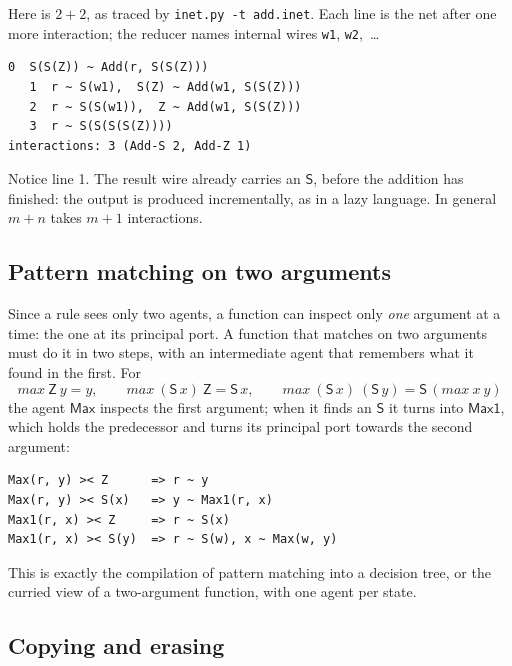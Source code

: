\documentclass[11pt,a4paper]{article}
\newcommand{\ag}[1]{\mathsf{#1}}
\newcommand{\Z}{\ag{Z}}
\newcommand{\Sa}{\ag{S}}
\theoremstyle{definition}
\theoremstyle{plain}
\begin{document}
Here is $2+2$, as traced by \texttt{inet.py -t add.inet}. Each line is the
net after one more interaction; the reducer names internal wires
\texttt{w1}, \texttt{w2},~\dots
\begin{lstlisting}[style=trace]
   0  S(S(Z)) ~ Add(r, S(S(Z)))
   1  r ~ S(w1),  S(Z) ~ Add(w1, S(S(Z)))
   2  r ~ S(S(w1)),  Z ~ Add(w1, S(S(Z)))
   3  r ~ S(S(S(S(Z))))
interactions: 3 (Add-S 2, Add-Z 1)
\end{lstlisting}
Notice line 1. The result wire already carries an $\Sa$, before the addition
has finished: the output is produced incrementally, as in a lazy language.
In general $m+n$ takes $m+1$ interactions.

\subsection{Pattern matching on two arguments}

Since a rule sees only two agents, a function can inspect only \emph{one}
argument at a time: the one at its principal port. A function that matches on
two arguments must do it in two steps, with an intermediate agent that
remembers what it found in the first. For
\[
  \mathit{max}\ \Z\ y = y, \qquad
  \mathit{max}\ (\Sa\,x)\ \Z = \Sa\,x, \qquad
  \mathit{max}\ (\Sa\,x)\ (\Sa\,y) = \Sa\,(\mathit{max}\ x\ y)
\]
the agent $\ag{Max}$ inspects the first argument; when it finds an $\Sa$ it
turns into $\ag{Max1}$, which holds the predecessor and turns its principal
port towards the second argument:
\begin{lstlisting}
Max(r, y) >< Z      => r ~ y
Max(r, y) >< S(x)   => y ~ Max1(r, x)
Max1(r, x) >< Z     => r ~ S(x)
Max1(r, x) >< S(y)  => r ~ S(w), x ~ Max(w, y)
\end{lstlisting}
This is exactly the compilation of pattern matching into a decision tree, or
the curried view of a two-argument function, with one agent per state.

\subsection{Copying and erasing}
\end{document}
